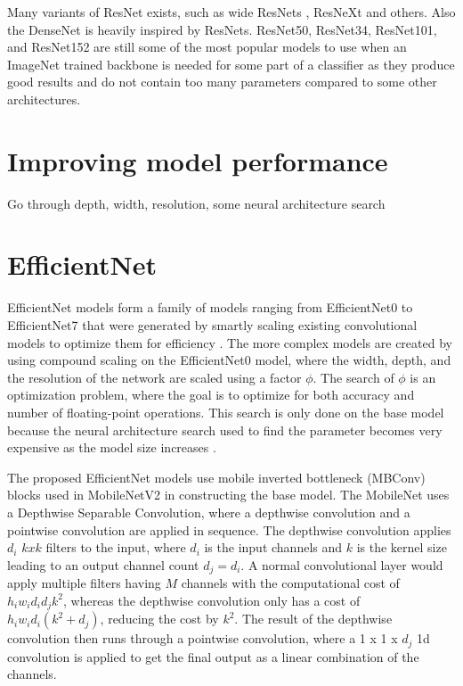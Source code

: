 Many variants of ResNet exists, such as wide ResNets \citep{wideResNet}, ResNeXt \citep{resNext} and others. Also the DenseNet \citep{denseNet} is heavily inspired by ResNets. ResNet50, ResNet34, ResNet101, and ResNet152 are still some of the most popular models to use when an ImageNet trained backbone is needed for some part of a classifier as they produce good results and do not contain too many parameters compared to some other architectures.

\section{Improving model performance}
Go through depth, width, resolution, some neural architecture search

\section{EfficientNet}
EfficientNet models form a family of models ranging from EfficientNet0 to EfficientNet7 that were generated by smartly scaling existing convolutional models to optimize them for efficiency \citep{efficientNet}. The more complex models are created by using compound scaling on the EfficientNet0 model, where the width, depth, and the resolution of the network are scaled using a factor ${\phi}$. The search of ${\phi}$ is an optimization problem, where the goal is to optimize for both accuracy and number of floating-point operations. This search is only done on the base model because the neural architecture search used to find the parameter becomes very expensive as the model size increases \citep{efficientNet}.

The proposed EfficientNet models use mobile inverted bottleneck (MBConv) blocks used in MobileNetV2 \citep{mobileNetv2} in constructing the base model. The MobileNet uses a Depthwise Separable Convolution, where a depthwise convolution and a pointwise convolution are applied in sequence. The depthwise convolution applies ${d_i}$ ${k x k}$ filters to the input, where ${d_i}$ is the input channels and ${k}$ is the kernel size leading to an output channel count ${d_j = d_i}$. A normal convolutional layer would apply multiple filters having ${M}$ channels with the computational cost of ${h_i w_i d_i d_j k^2}$, whereas the depthwise convolution only has a cost of ${h_i w_i d_i (k^2 + d_j)}$, reducing the cost by ${k^2}$. The result of the depthwise convolution then runs through a pointwise convolution, where a 1 x 1 x ${d_j}$ 1d convolution is applied to get the final output as a linear combination of the channels.



